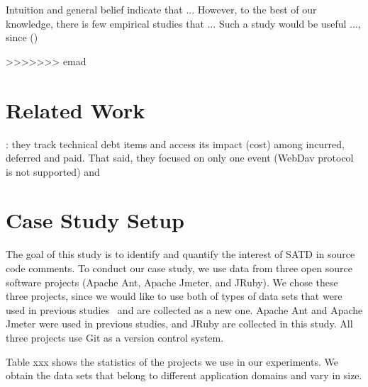 \documentclass[conference]{IEEEtran}
\begin{document}
Intuition and general belief indicate that ...
However, to the best of our knowledge, there is few empirical studies that 
...
Such a study would be useful ..., since ()



\cite{Potdar2014ICSME}
\cite{Maldonado2015MTD}

>>>>>>> emad

%
\section{Related Work}

\cite{Guo2011ICSM}: they track technical debt items and access its impact (cost) among incurred, deferred and paid. That said, they focused on only one event (WebDav protocol is not supported) and 


\section{Case Study Setup} \label{sec:setup}
The goal of this study is to identify and quantify the interest of SATD in source code comments.
To conduct our case study, we use data from three open source software  projects (Apache Ant, Apache Jmeter, and JRuby). We chose these three projects, since we would like to use both of types of data sets that were used in previous studies~\cite{Maldonado2015MTD,Potdar2014ICSME} and are collected as a new one. Apache Ant and Apache Jmeter were used in previous studies, and JRuby are collected in this study. All three projects use Git as a version control system. 


Table xxx shows the statistics of the projects we use in our experiments. We obtain the data sets that belong to different application domains and vary in size.

\end{document}
